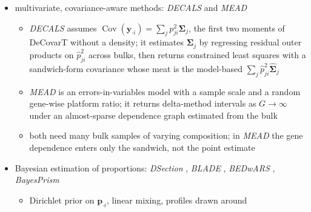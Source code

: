 \documentclass[pdflatex, sn-nature]{sn-jnl}
\theoremstyle{thmstyleone}%
\theoremstyle{thmstyletwo}%
\theoremstyle{thmstylethree}%
\begin{document}
\begin{itemize}
\begin{itemize}
          gene-wise platform ratio \(\tilde b_{g}=e^{\gamma_{g}}\) estimated in a first stage
          \cite{cableRobustDecompositionCell2022a}; \emph{DeconV} a Poisson or negative-binomial bulk obtained by
          summing the count laws fitted to single cells, a sum that stays negative binomial only because the
          probability parameter is shared by all cell types \cite{gynterDeconvProbabilisticCellType2023}
    \item \emph{RNA-Sieve} models noisy reference means across several bulks and returns
          Fisher or Godambe confidence regions; \emph{RCTD} and \emph{ReDeconv} return
          point estimates
  \end{itemize}
  \item multivariate, covariance-aware methods:
        \emph{DECALS} \cite{caiStatisticalInferenceCelltype2024} and
        \emph{MEAD} \cite{xieStatisticalInferenceCell2026}
  \begin{itemize}
    \item \emph{DECALS} assumes \(\operatorname{Cov}(\boldsymbol{y}_{\cdot i})=\sum_{j}p_{ji}^{2}\boldsymbol{\Sigma}_{j}\),
          the first two moments of DeCovarT without a density;
          it estimates \(\boldsymbol{\Sigma}_{j}\) by regressing residual outer products
          on \(\hat p_{ji}^{2}\) across bulks, then returns constrained least squares with a
          sandwich-form covariance whose meat is the model-based \(\sum_{j}\hat p_{ji}^{2}\hat{\boldsymbol{\Sigma}}_{j}\)
    \item \emph{MEAD} is an errors-in-variables model with a sample scale and a random
          gene-wise platform ratio; it returns delta-method intervals as \(G\to\infty\) under
          an almost-sparse dependence graph estimated from the bulk
    \item both need many bulk samples of varying composition; in \emph{MEAD} the gene
          dependence enters only the sandwich, not the point estimate
  \end{itemize}
  \item Bayesian estimation of proportions:
        \emph{DSection} \cite{erkkilaProbabilisticAnalysisGene2010},
        \emph{BLADE} \cite{andrade-barbosaBayesianLogNormalDeconvolution2021},
        \emph{BEDwARS} \cite{ghaffariBEDwARSRobustBayesian2023},
        \emph{BayesPrism} \cite{chuCellTypeGeneExpression2022}
  \begin{itemize}
    \item Dirichlet prior on \(\boldsymbol{p}_{\cdot i}\), linear mixing, profiles drawn around

\end{itemize}
\end{itemize}
\end{document}
